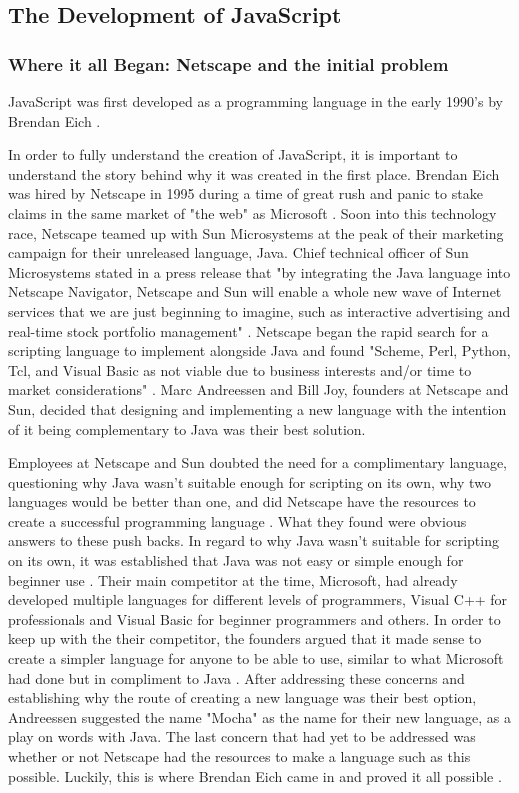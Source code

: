 \documentclass{article}
\theoremstyle{theorem}
\theoremstyle{definition}
\theoremstyle{remark}
\begin{document}
\subsection{The Development of JavaScript}

\subsubsection{Where it all Began: Netscape and the initial problem}

JavaScript was first developed as a programming language in the early 1990's by Brendan Eich \cite{2}.

In order to fully understand the creation of JavaScript, it is important to understand the story behind why it was created in the first place. Brendan Eich was hired by Netscape in 1995 during a time of great rush and panic to stake claims in the same market of "the web" as Microsoft \cite{1}. Soon into this technology race, Netscape teamed up with Sun Microsystems at the peak of their marketing campaign for their unreleased language, Java. Chief technical officer of Sun Microsystems stated in a press release that "by integrating the Java language into Netscape Navigator, Netscape and Sun will enable a whole new wave of Internet services that we are just beginning to imagine, such as interactive advertising and real-time stock portfolio management" \cite{4}. Netscape began the rapid search for a scripting language to implement alongside Java and found "Scheme, Perl, Python, Tcl, and Visual Basic as not viable due to business interests and/or time to market
considerations" \cite{1}. Marc Andreessen and Bill Joy, founders at Netscape and Sun, decided that designing and implementing a new language with the intention of it being complementary to Java was their best solution.

Employees at Netscape and Sun doubted the need for a complimentary language, questioning why Java wasn't suitable enough for scripting on its own, why two languages would be better than one, and did Netscape have the resources to create a successful programming language \cite{1}. What they found were obvious answers to these push backs. In regard to why Java wasn't suitable for scripting on its own, it was established that Java was not easy or simple enough for beginner use \cite{1}. Their main competitor at the time, Microsoft, had already developed multiple languages for different levels of programmers, Visual C++ for professionals and Visual Basic for beginner programmers and others. In order to keep up with the their competitor, the founders argued that it made sense to create a simpler language for anyone to be able to use, similar to what Microsoft had done but in compliment to Java \cite{1}. After addressing these concerns and establishing why the route of creating a new language was their best option, Andreessen suggested the name "Mocha" as the name for their new language, as a play on words with Java. The last concern that had yet to be addressed was whether or not Netscape had the resources to make a language such as this possible. Luckily, this is where Brendan Eich came in and proved it all possible \cite{1}.
\end{document}
